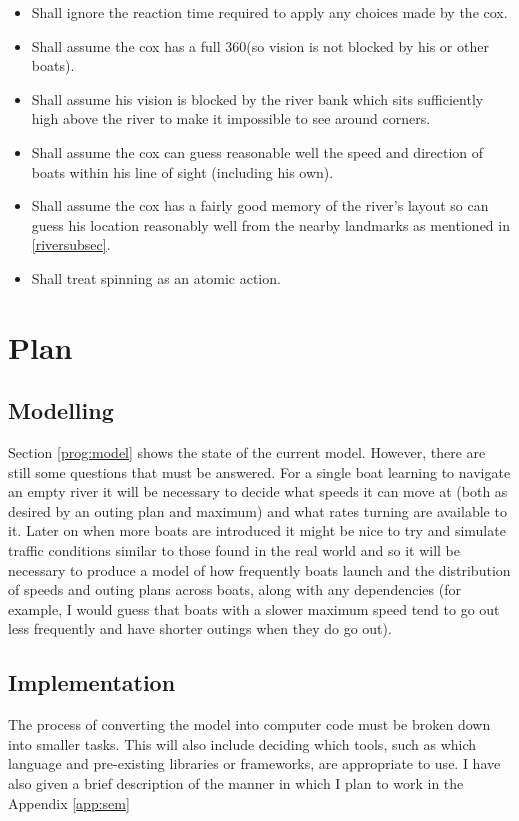 \begin{itemize}
  \item Shall ignore the reaction time required to apply any choices
    made by the cox.
  \item Shall assume the cox has a full 360\textdegree (so vision is
    not blocked by his or other boats). 
  \item Shall assume his
    vision is blocked by the river bank which sits sufficiently high
    above the river to make it impossible to see around corners.
  \item Shall assume the cox can guess reasonable well the speed and
    direction of boats within his line of sight (including his own).
  \item Shall assume the cox has a fairly good memory of the river's
    layout so can guess his location reasonably well from the nearby
    landmarks as mentioned in \ref{riversubsec}.
  \item Shall treat spinning as an atomic action.
\end{itemize}

\section{Plan}

\subsection{Modelling}

Section \ref{prog:model} shows the state of the current
model. However, there are still some questions that must be
answered. For a single boat learning to navigate an empty river it will be necessary to decide what speeds it can
move at (both as desired by an outing plan and maximum) and what rates
turning are available to it. Later on when more boats are introduced
it might be nice to try and simulate traffic conditions similar to
those found in the real world and
so it will be necessary to produce a model of how frequently boats
launch and the distribution of speeds and outing plans across boats,
along with any dependencies (for example, I would guess that boats
with a slower maximum speed tend to go out less frequently and have
shorter outings when they do go out).

\subsection{Implementation}
The process of converting
the model into computer code must be broken down into smaller
tasks. This will also include deciding which tools, such as which
language and pre-existing libraries or frameworks, are appropriate 
to use. I have also given a brief description of the manner in which I
plan to work in the Appendix \ref{app:sem}

